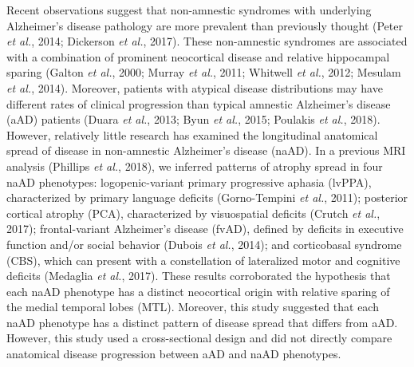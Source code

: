 \documentclass[]{article}
\begin{document}
Recent observations suggest that non-amnestic syndromes with underlying
Alzheimer's disease pathology are more prevalent than previously thought
(Peter \emph{et al.}, 2014; Dickerson \emph{et al.}, 2017). These
non-amnestic syndromes are associated with a combination of prominent
neocortical disease and relative hippocampal sparing (Galton \emph{et
al.}, 2000; Murray \emph{et al.}, 2011; Whitwell \emph{et al.}, 2012;
Mesulam \emph{et al.}, 2014). Moreover, patients with atypical disease
distributions may have different rates of clinical progression than
typical amnestic Alzheimer's disease (aAD) patients (Duara \emph{et
al.}, 2013; Byun \emph{et al.}, 2015; Poulakis \emph{et al.}, 2018).
However, relatively little research has examined the longitudinal
anatomical spread of disease in non-amnestic Alzheimer's disease (naAD).
In a previous MRI analysis (Phillips \emph{et al.}, 2018), we inferred
patterns of atrophy spread in four naAD phenotypes: logopenic-variant
primary progressive aphasia (lvPPA), characterized by primary language
deficits (Gorno-Tempini \emph{et al.}, 2011); posterior cortical atrophy
(PCA), characterized by visuospatial deficits (Crutch \emph{et al.},
2017); frontal-variant Alzheimer's disease (fvAD), defined by deficits
in executive function and/or social behavior (Dubois \emph{et al.},
2014); and corticobasal syndrome (CBS), which can present with a
constellation of lateralized motor and cognitive deficits (Medaglia
\emph{et al.}, 2017). These results corroborated the hypothesis that
each naAD phenotype has a distinct neocortical origin with relative
sparing of the medial temporal lobes (MTL). Moreover, this study
suggested that each naAD phenotype has a distinct pattern of disease
spread that differs from aAD. However, this study used a cross-sectional
design and did not directly compare anatomical disease progression
between aAD and naAD phenotypes.
\end{document}
